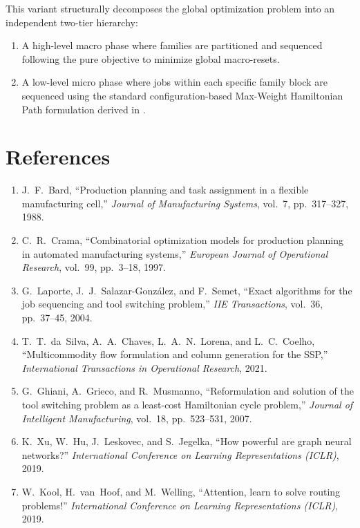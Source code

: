 \documentclass[11pt,a4paper]{article}
\theoremstyle{plain}
\theoremstyle{definition}
\newcommand{\JGP}{\text{JGP}}
\newcommand{\SSP}{\text{SSP}}
\begin{document}
This variant structurally decomposes the global \SSP{} optimization problem into an independent two-tier hierarchy:
\begin{enumerate}[label=\arabic*)]
	\item A high-level macro phase where families are partitioned and sequenced following the pure \JGP{} objective to minimize global macro-resets.
	\item A low-level micro phase where jobs within each specific family block are sequenced using the standard configuration-based Max-Weight Hamiltonian Path formulation derived in .
\end{enumerate}

\section{References}
\begin{enumerate}
	\item J.~F.~Bard, ``Production planning and task assignment in a flexible manufacturing cell,'' \textit{Journal of Manufacturing Systems}, vol.~7, pp.~317--327, 1988.
	\item C.~R.~Crama, ``Combinatorial optimization models for production planning in automated manufacturing systems,'' \textit{European Journal of Operational Research}, vol.~99, pp.~3--18, 1997.
	\item G.~Laporte, J.~J.~Salazar-Gonz\'{a}lez, and F.~Semet, ``Exact algorithms for the job sequencing and tool switching problem,'' \textit{IIE Transactions}, vol.~36, pp.~37--45, 2004.
	\item T.~T.~da~Silva, A.~A.~Chaves, L.~A.~N.~Lorena, and L.~C.~Coelho, ``Multicommodity flow formulation and column generation for the SSP,'' \textit{International Transactions in Operational Research}, 2021.
	\item G.~Ghiani, A.~Grieco, and R.~Musmanno, ``Reformulation and solution of the tool switching problem as a least-cost Hamiltonian cycle problem,'' \textit{Journal of Intelligent Manufacturing}, vol.~18, pp.~523--531, 2007.
	\item K.~Xu, W.~Hu, J.~Leskovec, and S.~Jegelka, ``How powerful are graph neural networks?'' \textit{International Conference on Learning Representations (ICLR)}, 2019.
	\item W.~Kool, H.~van~Hoof, and M.~Welling, ``Attention, learn to solve routing problems!'' \textit{International Conference on Learning Representations (ICLR)}, 2019.
\end{enumerate}
\end{document}
